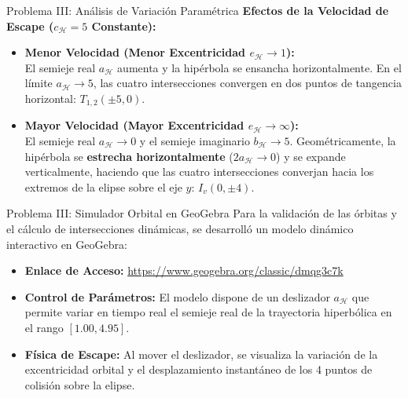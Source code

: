 \documentclass[aspectratio=169]{beamer}
\begin{document}
\begin{frame}{Problema III: Análisis de Variación Paramétrica}
  \textbf{Efectos de la Velocidad de Escape ($c_{\mathcal{H}} = 5$ Constante):}
  \vspace{0.2cm}
  \begin{itemize}
    \item \textbf{Menor Velocidad (Menor Excentricidad $e_{\mathcal{H}} \to 1$):} \\
      El semieje real $a_{\mathcal{H}}$ aumenta y la hipérbola se ensancha horizontalmente. En el límite $a_{\mathcal{H}} \to 5$, las cuatro intersecciones convergen en dos puntos de tangencia horizontal: $T_{1,2}(\pm 5, 0)$.
    \vspace{0.2cm}
    \item \textbf{Mayor Velocidad (Mayor Excentricidad $e_{\mathcal{H}} \to \infty$):} \\
      El semieje real $a_{\mathcal{H}} \to 0$ y el semieje imaginario $b_{\mathcal{H}} \to 5$. Geométricamente, la hipérbola se \textbf{estrecha horizontalmente} ($2a_{\mathcal{H}} \to 0$) y se expande verticalmente, haciendo que las cuatro intersecciones converjan hacia los extremos de la elipse sobre el eje $y$: $I_v(0, \pm 4)$.
  \end{itemize}
\end{frame}

\begin{frame}{Problema III: Simulador Orbital en GeoGebra}
  Para la validación de las órbitas y el cálculo de intersecciones dinámicas, se desarrolló un modelo dinámico interactivo en GeoGebra:
  \vspace{0.3cm}
  \begin{itemize}
    \item \textbf{Enlace de Acceso:} \url{https://www.geogebra.org/classic/dmqg3c7k}
    \item \textbf{Control de Parámetros:} El modelo dispone de un deslizador $a_{\mathcal{H}}$ que permite variar en tiempo real el semieje real de la trayectoria hiperbólica en el rango $[1.00, 4.95]$.
    \item \textbf{Física de Escape:} Al mover el deslizador, se visualiza la variación de la excentricidad orbital y el desplazamiento instantáneo de los 4 puntos de colisión sobre la elipse.
  \end{itemize}
\end{frame}
\end{document}
